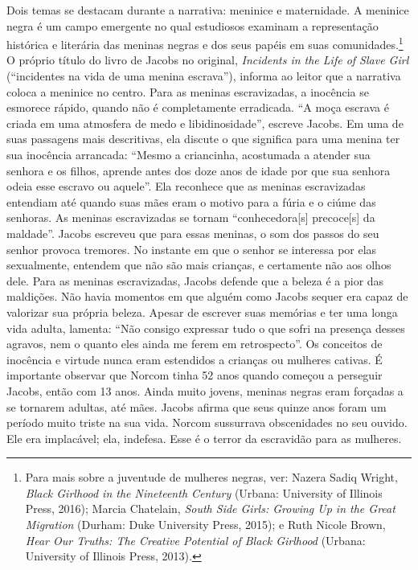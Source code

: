 Dois temas se destacam durante a narrativa: meninice e maternidade. A
meninice negra é um campo emergente no qual estudiosos examinam a
representação histórica e literária das meninas negras e dos seus papéis
em suas comunidades.\footnote{Para mais sobre a juventude de mulheres
  negras, ver: Nazera Sadiq Wright, \emph{Black Girlhood in the
  Nineteenth Century} (Urbana: University of Illinois Press, 2016);
  Marcia Chatelain, \emph{South Side Girls: Growing Up in the Great
  Migration} (Durham: Duke University Press, 2015); e Ruth Nicole Brown,
  \emph{Hear Our Truths: The Creative Potential of Black Girlhood}
  (Urbana: University of Illinois Press, 2013).} O próprio título do
livro de Jacobs no original, \emph{Incidents in the Life of Slave Girl}
(``incidentes na vida de uma menina escrava''), informa ao leitor que a
narrativa coloca a meninice no centro. Para as meninas escravizadas, a
inocência se esmorece rápido, quando não é completamente erradicada. ``A
moça escrava é criada em uma atmosfera de medo e libidinosidade'',
escreve Jacobs. Em uma de suas passagens mais descritivas, ela discute o
que significa para uma menina ter sua inocência arrancada: ``Mesmo a
criancinha, acostumada a atender
sua senhora e os filhos, aprende antes dos doze anos de idade por que
sua senhora odeia esse escravo ou aquele''. Ela reconhece que as meninas
escravizadas entendiam até quando suas mães eram o motivo para a fúria e
o ciúme das senhoras. As meninas escravizadas se tornam
``conhecedora{[}s{]} precoce{[}s{]} da maldade''. Jacobs escreveu que
para essas meninas, o som dos passos do seu senhor provoca
tremores. No instante em que o senhor se interessa por elas sexualmente,
entendem que não são mais crianças, e certamente
não aos olhos dele. Para as meninas escravizadas, Jacobs defende que a
beleza é a pior das maldições. Não havia momentos em que alguém como
Jacobs sequer era capaz de valorizar sua própria beleza. Apesar de
escrever suas memórias e ter uma longa vida adulta, lamenta:
``Não consigo expressar tudo o que sofri na presença desses agravos, nem
o quanto eles ainda me ferem em retrospecto''. Os conceitos de inocência
e virtude nunca eram estendidos a crianças ou mulheres cativas. É
importante observar que Norcom tinha 52 anos quando começou a perseguir
Jacobs, então com 13 anos. Ainda muito jovens, meninas negras eram
forçadas a se tornarem adultas, até mães. Jacobs afirma que seus quinze
anos foram um período muito triste na sua vida. Norcom
sussurrava obscenidades no seu ouvido. Ele era implacável; ela,
indefesa. Esse é o terror da escravidão para as mulheres.

